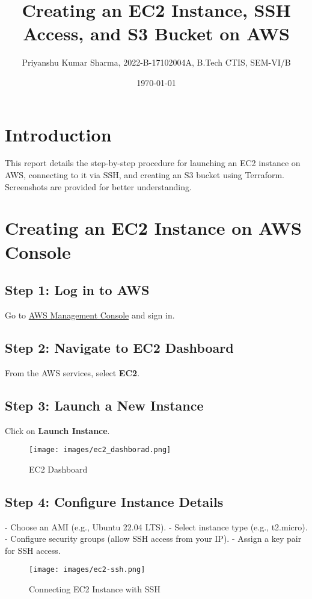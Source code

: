 \documentclass{article}
\title{Creating an EC2 Instance, SSH Access, and S3 Bucket on AWS}
\author{Priyanshu Kumar Sharma, 2022-B-17102004A, B.Tech CTIS, SEM-VI/B}
\date{\today}
\begin{document}
\maketitle

\section{Introduction}
This report details the step-by-step procedure for launching an EC2 instance on AWS, connecting to it via SSH, and creating an S3 bucket using Terraform. Screenshots are provided for better understanding.

\section{Creating an EC2 Instance on AWS Console}

\subsection{Step 1: Log in to AWS}
Go to \href{https://aws.amazon.com/}{AWS Management Console} and sign in.

\subsection{Step 2: Navigate to EC2 Dashboard}
From the AWS services, select \textbf{EC2}.

\subsection{Step 3: Launch a New Instance}
Click on \textbf{Launch Instance}.

\begin{figure}[H]
    \centering
    \texttt{[image: images/ec2\_dashborad.png]}
    \caption{EC2 Dashboard}
    \label{fig:ec2_dashboard}
\end{figure}

\subsection{Step 4: Configure Instance Details}
- Choose an AMI (e.g., Ubuntu 22.04 LTS).
- Select instance type (e.g., t2.micro).
- Configure security groups (allow SSH access from your IP).
- Assign a key pair for SSH access.

\begin{figure}[H]
    \centering
    \texttt{[image: images/ec2-ssh.png]}
    \caption{Connecting EC2 Instance with SSH}
    \label{fig:instance_ssh}
\end{figure}
\end{document}
